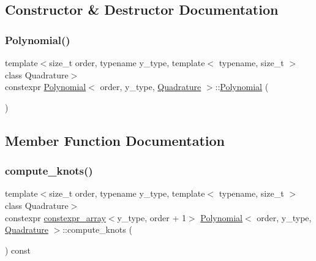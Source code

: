\subsection{Constructor \& Destructor Documentation}
\mbox{\label{class_polynomial_a00671b3dba3b832c130d1f019c7702c3}} 
\subsubsection{\texorpdfstring{Polynomial()}{Polynomial()}}
{\footnotesize\ttfamily template$<$size\+\_\+t order, typename y\+\_\+type, template$<$ typename, size\+\_\+t $>$ class Quadrature$>$ \\
constexpr \hyperlink{class_polynomial}{Polynomial}$<$ order, y\+\_\+type, \hyperlink{class_quadrature}{Quadrature} $>$\+::\hyperlink{class_polynomial}{Polynomial} (\begin{DoxyParamCaption}{ }\end{DoxyParamCaption})\hspace{0.3cm}{\ttfamily [inline]}}



\subsection{Member Function Documentation}
\mbox{\label{class_polynomial_a231fb6b5f655784af1628e9b2f261f08}} 
\subsubsection{\texorpdfstring{compute\+\_\+knots()}{compute\_knots()}}
{\footnotesize\ttfamily template$<$size\+\_\+t order, typename y\+\_\+type, template$<$ typename, size\+\_\+t $>$ class Quadrature$>$ \\
constexpr \hyperlink{classconstexpr__array}{constexpr\+\_\+array}$<$y\+\_\+type, order + 1$>$ \hyperlink{class_polynomial}{Polynomial}$<$ order, y\+\_\+type, \hyperlink{class_quadrature}{Quadrature} $>$\+::compute\+\_\+knots (\begin{DoxyParamCaption}{ }\end{DoxyParamCaption}) const\hspace{0.3cm}{\ttfamily [inline]}}

